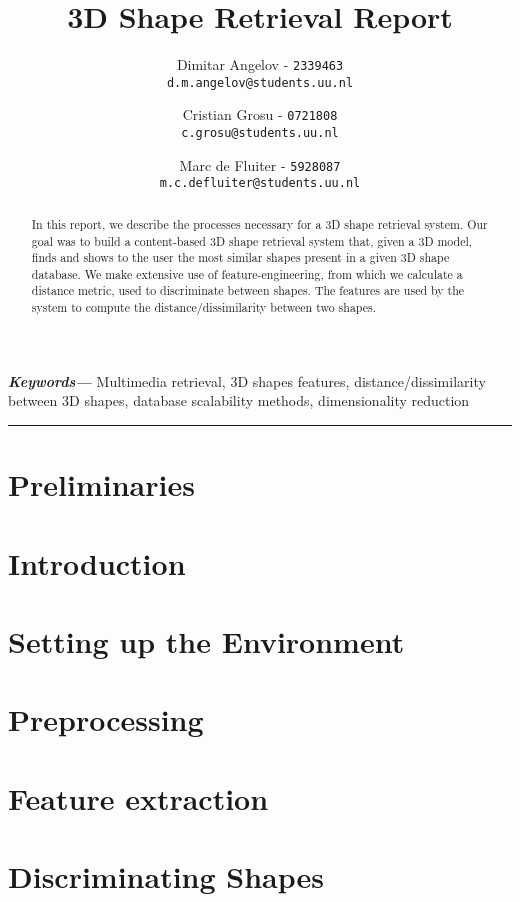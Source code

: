 \documentclass{article}
\title{3D Shape Retrieval Report}
\author{
  \small{Dimitar Angelov - \texttt{2339463}} \\
  \small{\texttt{d.m.angelov@students.uu.nl}}
  \and
  \small{Cristian Grosu - \texttt{0721808}} \\
  \small{\texttt{c.grosu@students.uu.nl}}
  \and
  \small{Marc de Fluiter - \texttt{5928087}} \\
  \small{\texttt{m.c.defluiter@students.uu.nl}} 
}
\providecommand{\keywords}[1]
{
  \small	
  \textbf{\textit{Keywords---}} #1
}
\begin{document}
\maketitle

\begin{abstract}
In this report, we describe the processes necessary for a 3D shape retrieval system.
Our goal was to build a content-based 3D shape retrieval system that, given a 3D model, finds and shows to the user
the most similar shapes present in a given 3D shape database.
We make extensive use of feature-engineering, from which we calculate a distance metric, used to discriminate between
shapes.
The features are used by the system to compute the distance/dissimilarity between two shapes.
\end{abstract}

\keywords{
Multimedia retrieval, 3D shapes features, distance/dissimilarity between 3D shapes, database scalability methods, dimensionality reduction
}

\hrule
\section*{Preliminaries}

 
\newpage
\section{Introduction}
\label{section:introduction}


\section{Setting up the Environment}
\label{section:setting-the-environment}


\section{Preprocessing}
\label{section:preprocessing}


\section{Feature extraction}
\label{section:feature-extraction}


\section{Discriminating Shapes}
\label{section:discriminating-using-features}

\end{document}
